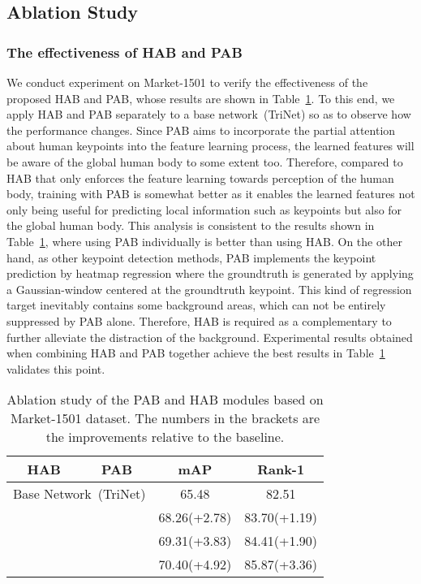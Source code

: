 \documentclass[10pt,twocolumn,letterpaper]{article}
\begin{document}
\subsection{Ablation Study}

\subsubsection{The effectiveness of HAB and PAB}
We conduct experiment on Market-1501 to verify the effectiveness of the proposed HAB and PAB, whose results are shown in Table~\ref{ablation_modules}. To this end, we apply HAB and PAB separately to a base network~(TriNet) so as to observe how the performance changes. Since PAB aims to incorporate the partial attention about human keypoints into the feature learning process, the learned features will be aware of the global human body to some extent too. Therefore, compared to HAB that only enforces the feature learning towards perception of the human body, training with PAB is somewhat better as it enables the learned features not only being useful for predicting local information such as keypoints but also for the global human body. This analysis is consistent to the results shown in Table~\ref{ablation_modules}, where using PAB individually is better than using HAB. On the other hand, as other keypoint detection methods, PAB implements the keypoint prediction by heatmap regression where the groundtruth is generated by applying a Gaussian-window centered at the groundtruth keypoint. This kind of regression target inevitably contains some background areas, which can not be entirely suppressed by PAB alone. Therefore, HAB is required as a complementary to further alleviate the distraction of the background. Experimental results obtained when combining HAB and PAB together achieve the best results in Table~\ref{ablation_modules} validates this point.


\begin{table}[h]
	\begin{center}
		\begin{tabular}{cccc}
			\hline
			HAB & PAB & mAP & Rank-1 \bigstrut\\
			\hline
			\multicolumn{2}{c}{Base Network~(TriNet)} & 65.48 & 82.51 \bigstrut\\
			\hline
			\checkmark & & 68.26(+2.78) & 83.70(+1.19) \bigstrut[t]\\
			& \checkmark & 69.31(+3.83) & 84.41(+1.90) \\
			\checkmark & \checkmark & 70.40(+4.92) & 85.87(+3.36) \bigstrut[b]\\		
			\hline
		\end{tabular}
	\end{center}
	\caption{Ablation study of the PAB and HAB modules based on Market-1501 dataset. The numbers in the brackets are the improvements relative to the baseline.}
	\label{ablation_modules}
\end{table}
\end{document}
